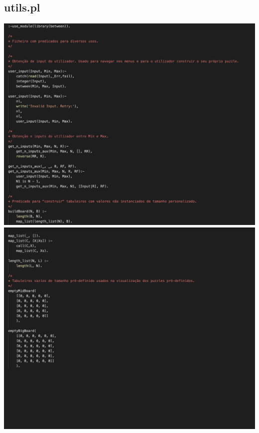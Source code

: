 \documentclass[a4paper]{article}
\begin{document}
\subsection{utils.pl}
\begin{center}
    \includegraphics[scale=0.4]{img/23.png}
    \includegraphics[scale=0.4]{img/24.png}
\end{center}

\clearpage
\renewcommand\refname{Apendix}



\newpage
\appendix
\end{document}
